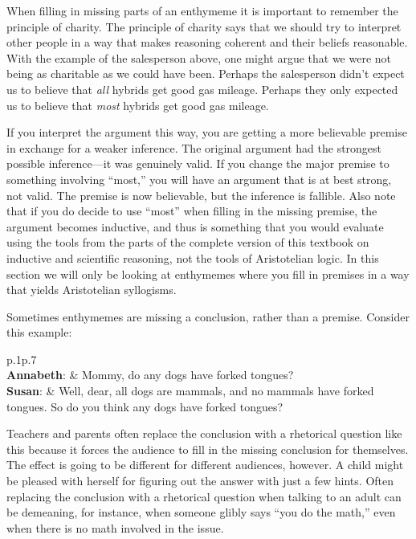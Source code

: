 When filling in missing parts of an enthymeme it is important to remember the principle of charity. The principle of charity says that we should try to interpret other people in a way that makes reasoning coherent and their beliefs reasonable. With the example of the salesperson above, one might argue that we were not being as charitable as we could have been. Perhaps the salesperson didn't expect us to believe that \textit{all} hybrids get good gas mileage. Perhaps they only expected us to believe that \textit{most} hybrids get good gas mileage. 

If you interpret the argument this way, you are getting a more believable premise in exchange for a weaker inference. The original argument had the strongest possible inference---it was genuinely valid. If you change the major premise to something involving ``most,'' you will have an argument that is at best strong, not  valid. The premise is now believable, but the inference is fallible.   Also note that if you do decide to use ``most'' when filling in the missing premise, the argument becomes inductive, and thus is something that you would evaluate using the tools from the parts of the complete version of this textbook on inductive and scientific reasoning,  \label{ver_var} not the tools of Aristotelian logic. In this section we will only be looking at enthymemes where you fill in premises in a way that yields Aristotelian syllogisms. 

Sometimes enthymemes are missing a conclusion, rather than a premise. Consider this example:

\begin{tabu}{p{.1\linewidth}p{.7\linewidth}}
\\
\textbf{Annabeth}: & Mommy, do any dogs have forked tongues? \\
\textbf{Susan}:  & Well, dear, all dogs are mammals, and no mammals have forked tongues. So do you think any dogs have forked tongues?\\
\end{tabu}

Teachers and parents often replace the conclusion with a rhetorical question like this because it forces the audience to fill in the missing conclusion for themselves. The effect is going to be different for different audiences, however. A child might be pleased with herself for figuring out the answer with just a few hints. Often replacing the conclusion with a rhetorical question when talking to an adult can be demeaning, for instance, when someone glibly says ``you do the math,'' even when there is no math involved in the issue. 

